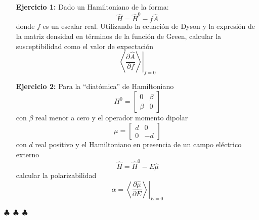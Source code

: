 \documentclass[a4paper,12pt]{article}
\begin{document}
\begin{enumerate}
    \item[\bf Ejercicio 1:] Dado un Hamiltoniano de la forma:
    \begin{equation}
    \hat{H}=\hat{H}^0-f\hat{A}
    \end{equation}
    donde $f$ es un escalar real. Utilizando la ecuación de Dyson y la expresión de la matriz densidad en términos de la función de Green, calcular la susceptibilidad como el valor de expectación
    \begin{equation}
    \left.\left\langle  \frac{\partial \hat{A}}{\partial f}\right\rangle\right|_{f=0}
    \end{equation}

    \item[\bf Ejercicio 2:] Para la ``diatómica'' de Hamiltoniano 
    \begin{equation}
        H^0 = \begin{bmatrix}
            0 & \beta \\
            \beta & 0 
            \end{bmatrix}
    \end{equation}
    con $\beta$ real menor a cero y el operador momento dipolar
    \begin{equation}
        \mu = \begin{bmatrix}
            d & 0 \\
            0 & -d 
            \end{bmatrix}
    \end{equation}
    con $d$ real positivo y el Hamiltoniano en presencia de un campo eléctrico externo
    \begin{equation}
    \hat{H}=\hat{H}^0-E\hat{\mu}
   	\end{equation}   
    calcular la polarizabilidad
    \begin{equation}
    \alpha = \left.\left\langle  \frac{\partial \hat{\mu}}{\partial E}\right\rangle\right|_{E=0}
    \end{equation}
\end{enumerate}

\vspace{1cm}
\begin{center}
    $\clubsuit$~$\clubsuit$~$\clubsuit$
  \end{center}
\end{document}
